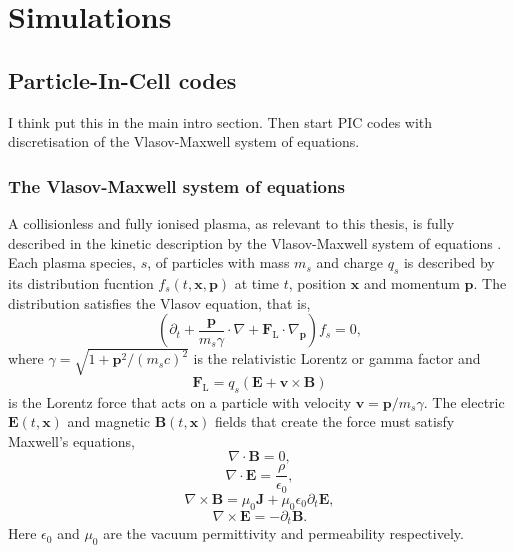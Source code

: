 \section{Simulations}
\subsection{Particle-In-Cell codes}

I think put this in the main intro section. Then start PIC codes with discretisation of the Vlasov-Maxwell system of equations.

\subsubsection{The Vlasov-Maxwell system of equations}
A collisionless and fully ionised plasma, as relevant to this thesis, is fully described in the kinetic description by the Vlasov-Maxwell system of equations \cite{derouillat_2018_SmileiCollaborativeOpensource}. Each plasma species, $s$, of particles with mass $m_s$ and charge $q_s$ is described by its distribution fucntion $f_s(t,\mathbf{x},\mathbf{p})$ at time $t$, position $\mathbf{x}$ and momentum $\mathbf{p}$. The distribution satisfies the Vlasov equation, that is,
\begin{equation}
	(\partial_t + \frac{\mathbf{p}}{m_s\gamma} \cdot \nabla + \mathbf{F}_\mathrm{L} \cdot \nabla_\mathbf{p})f_s = 0,
\end{equation}
where $\gamma = \sqrt{1+\mathbf{p}^2/(m_sc)^2}$ is the relativistic Lorentz or gamma factor and 
\begin{equation}
	\mathbf{F}_\mathrm{L} = q_s(\mathbf{E} + \mathbf{v} \times \mathbf{B})
\end{equation}
is the Lorentz force that acts on a particle with velocity $\mathbf{v}  = \mathbf{p}/m_s\gamma$. The electric $\mathbf{E}(t,\mathbf{x})$ and magnetic $\mathbf{B}(t,\mathbf{x})$ fields that create the force must satisfy Maxwell's equations,
\begin{equation}
	\nabla \cdot \mathbf{B} = 0,
\end{equation}
\begin{equation}
	\nabla \cdot \mathbf{E} = \frac{\rho}{\epsilon_0},
\end{equation}
\begin{equation}
	\nabla \times \mathbf{B} = \mu_0 \mathbf{J} + \mu_0 \epsilon_0 \partial_t \mathbf{E},
\end{equation}
\begin{equation}
	\nabla \times \mathbf{E} =-\partial_t \mathbf{B}.
\end{equation}
Here $\epsilon_0$ and $\mu_0$ are the vacuum permittivity and permeability respectively.

